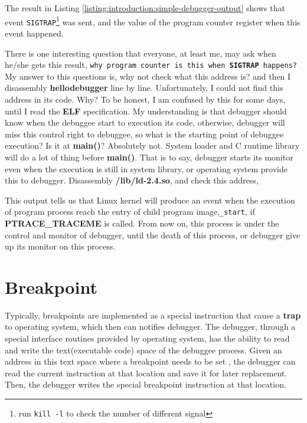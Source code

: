 \documentclass[12pt]{book}
\begin{document}
\begin{CJK}{UTF8}{gbsn}


The result in Listing \ref{listing:introduction:simple-debugger-output} shows that event 
\texttt{SIGTRAP}\footnote{run \texttt{kill -l} to check the number of different signal} was sent, 
and the value of the program counter register when this event happened.

There is one interesting question that everyone, at least me, may ask when he/she gets this result, 
\texttt{why program counter is this when \textbf{SIGTRAP} happens?}
My answer to this questions is, why not check what this address is?
and then I disassembly \textbf{hellodebugger} line by line.  Unfortunately, 
I could not find this address in its code.  Why?  To be honest, I am confused
by this for some days, until I read the \textbf{ELF} specification\cite{Manual:ELF}.
My understanding is that debugger should know when the debuggee start to
execution its code, otherwise, debugger will miss this control right to debuggee, 
so what is the starting point of debuggee execution?  Is it at \textbf{main()}?  Absolutely not.
System loader and C runtime library will do a lot of thing before \textbf{main()}.
That is to say, debugger starts its monitor even when the execution is still
in system library, or operating system provide this to debugger.
Disassembly \textbf{/lib/ld-2.4.so}, and check this address,



This output tells us that Linux kernel will produce an event when the 
execution of program process reach the entry of child program image,\texttt{\_start}, 
if \textbf{PTRACE\_TRACEME} is called. 
From now on, this process is under the control and monitor of debugger, 
until the death of this process, or debugger give up its monitor on this process.





\chapter{Breakpoint}
\label{chap:breakpoint}
Typically, breakpoints are implemented as a special instruction that cause
a \textbf{trap} to operating system, which then can notifies debugger.  The debugger,
through a special interface routines provided by operating system, has the
ability to read and write the text(executable code) space of the debuggee
process.  Given an address in this text space where a breakpoint needs to be
set , the debugger can read the current instruction at that location and
save it for later replacement.  Then, the debugger writes the special
breakpoint instruction at that location.



\end{CJK}
\end{document}
